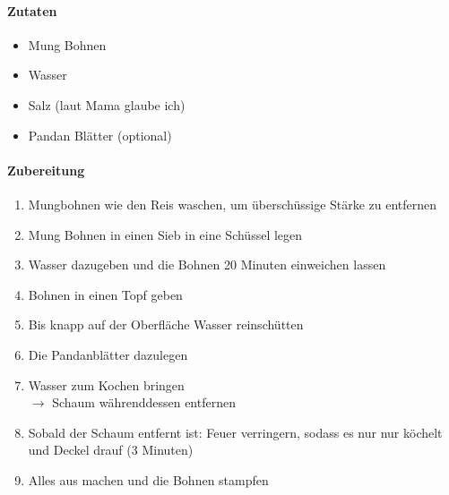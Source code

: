 \newpage
{}
\paragraph{Zutaten}
\begin{itemize}[noitemsep]
	\item Mung Bohnen
	\item Wasser
	\item Salz (laut Mama glaube ich)
	\item Pandan Blätter (optional)
\end{itemize}
\paragraph{Zubereitung}
\begin{enumerate}[noitemsep]
	\item Mungbohnen wie den Reis waschen, um überschüssige Stärke zu entfernen
	\item Mung Bohnen in einen Sieb in eine Schüssel legen
	\item Wasser dazugeben und die Bohnen 20 Minuten einweichen lassen
	\item Bohnen in einen Topf geben
	\item Bis knapp auf der Oberfläche Wasser reinschütten
	\item Die Pandanblätter dazulegen
	\item Wasser zum Kochen bringen \\
		$\rightarrow$ Schaum währenddessen entfernen
	\item Sobald der Schaum entfernt ist: Feuer verringern, sodass es nur nur köchelt und Deckel drauf (3 Minuten)
	\item Alles aus machen und die Bohnen stampfen 
\end{enumerate}
